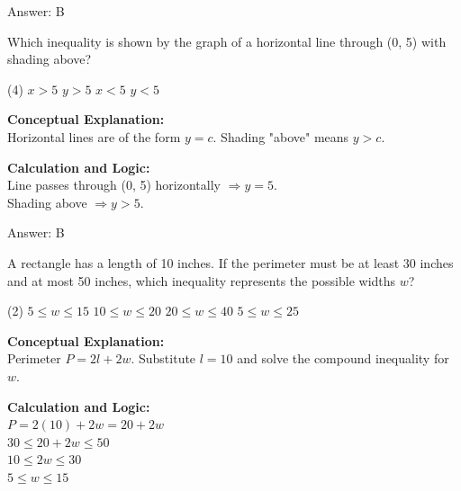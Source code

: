 \documentclass[11pt,paper=a4,answers]{exam}
\begin{document}
\begin{questions}
\begin{solution}
\vspace{15pt}
Answer: \colorbox{yellow!100}{B}
\end{solution}

\vspace{20pt}

\question
Which inequality is shown by the graph of a horizontal line through (0, 5) with shading above?
\begin{tasks}(4)
    \task $x > 5$
    \task $y > 5$
    \task $x < 5$
    \task $y < 5$
\end{tasks}

\begin{solution}
\textbf{Conceptual Explanation:} \\
Horizontal lines are of the form $y = c$. Shading "above" means $y > c$.

\vspace{10pt}
\textbf{Calculation and Logic:} \\
Line passes through (0, 5) horizontally $\Rightarrow y = 5$. \\
Shading above $\Rightarrow y > 5$.

\vspace{15pt}
Answer: \colorbox{yellow!100}{B}
\end{solution}

\vspace{20pt}

\question
A rectangle has a length of 10 inches. If the perimeter must be at least 30 inches and at most 50 inches, which inequality represents the possible widths $w$?
\begin{tasks}(2)
    \task $5 \le w \le 15$
    \task $10 \le w \le 20$
    \task $20 \le w \le 40$
    \task $5 \le w \le 25$
\end{tasks}

\begin{solution}
\textbf{Conceptual Explanation:} \\
Perimeter $P = 2l + 2w$. Substitute $l = 10$ and solve the compound inequality for $w$.

\vspace{10pt}
\textbf{Calculation and Logic:} \\
$P = 2(10) + 2w = 20 + 2w$ \\
$30 \le 20 + 2w \le 50$ \\
$10 \le 2w \le 30$ \\
$5 \le w \le 15$


\end{solution}
\end{questions}
\end{document}
